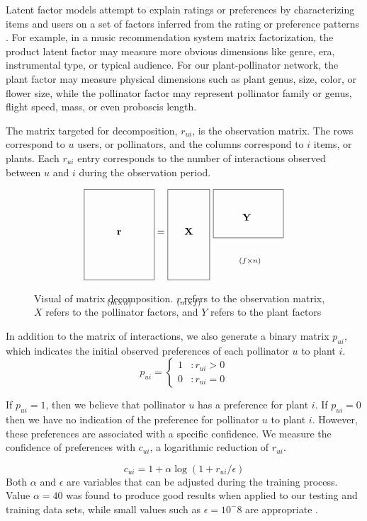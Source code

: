 \documentclass[twocolumn]{article}
\newcommand*{\mat}[1]{\boldsymbol{\mathrm{#1}}}
\newcommand*{\subdims}[3]{\clap{\raisebox{#1}[0pt][0pt]{$\scriptstyle(#2 \times #3)$}}}
\begin{document}
Latent factor models attempt to explain ratings or preferences by characterizing items and users
on a set of factors inferred from the rating or preference patterns \cite{koren2009matrix}.  For example, 
in a music recommendation system matrix factorization,
the product latent factor may measure more obvious dimensions like genre, era, instrumental type, or typical audience.
For our plant-pollinator network, the plant factor may measure physical dimensions such as plant genus, size,
color, or flower size, while the pollinator factor may represent pollinator family or genus, flight speed, mass,
or even proboscis length.

The matrix targeted for decomposition, $r_{ui}$, is the observation matrix.
The rows correspond to $u$ users, or pollinators, and the columns correspond to $i$ items, or plants. 
Each $r_{ui}$ entry corresponds to the number of interactions observed between $u$ and $i$ during
the observation period.

\begin{figure}
  \caption{Visual of matrix decomposition. $r$ refers to the observation matrix, $X$ refers to the pollinator factors, and $Y$ refers to the plant factors}
  \[
    \framebox[2.5cm]{\clap{\raisebox{0pt}[1.5cm][1.5cm]{$\mat r$}}\subdims{-2.5cm} m n} =
    \framebox[1.5cm]{\clap{\raisebox{0pt}[1.5cm][1.5cm]{$\mat X$}}\subdims{-2.5cm} m f} \ 
    \framebox[2.5cm]{\clap{\raisebox{5mm}[1.5cm]{$\mat Y$}}     \subdims{-1cm} f n}
  \]

\end{figure}

In addition to the matrix of interactions, we also generate a binary matrix $p_{ui}$, which indicates
the initial observed preferences of each pollinator $u$ to plant $i$.
\begin{displaymath}
  p_{ui} = \left\{
    \begin{array}{lr}
      1 & : r_{ui} > 0\\
      0 & : r_{ui} = 0
    \end{array}
  \right.
\end{displaymath}

If $p_{ui} = 1$, then we believe that pollinator $u$ has a preference for plant $i$. If $p_{ui} = 0$ then we
have no indication of the preference for pollinator $u$ to plant $i$. However, these preferences are 
associated with a specific confidence. We measure the confidence of preferences with $c_{ui}$, a logarithmic
reduction of $r_{ui}$.

\begin{equation}
  \label{eq:1}
  c_{ui} = 1 + \alpha\log (1 + r_{ui}/\epsilon)
\end{equation}
Both $\alpha$ and $\epsilon$ are variables that can be adjusted during the training process. Value
$\alpha = 40$ was found to produce good results when applied to our testing and training data sets,
while small values such as $\epsilon = 10^-8$ are appropriate
\cite{hu2008collaborative}.
\end{document}
